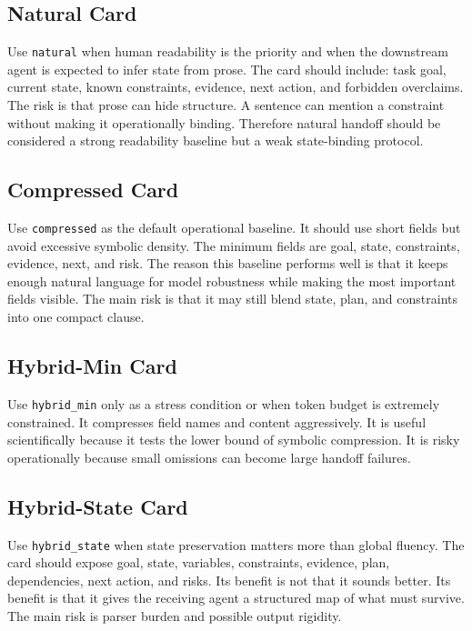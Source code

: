 \documentclass[11pt]{article}
\begin{document}
\subsection{Natural Card}
Use \texttt{natural} when human readability is the priority and when the downstream agent is expected to infer state from prose. The card should include: task goal, current state, known constraints, evidence, next action, and forbidden overclaims. The risk is that prose can hide structure. A sentence can mention a constraint without making it operationally binding. Therefore natural handoff should be considered a strong readability baseline but a weak state-binding protocol.

\subsection{Compressed Card}
Use \texttt{compressed} as the default operational baseline. It should use short fields but avoid excessive symbolic density. The minimum fields are goal, state, constraints, evidence, next, and risk. The reason this baseline performs well is that it keeps enough natural language for model robustness while making the most important fields visible. The main risk is that it may still blend state, plan, and constraints into one compact clause.

\subsection{Hybrid-Min Card}
Use \texttt{hybrid\_min} only as a stress condition or when token budget is extremely constrained. It compresses field names and content aggressively. It is useful scientifically because it tests the lower bound of symbolic compression. It is risky operationally because small omissions can become large handoff failures.

\subsection{Hybrid-State Card}
Use \texttt{hybrid\_state} when state preservation matters more than global fluency. The card should expose goal, state, variables, constraints, evidence, plan, dependencies, next action, and risks. Its benefit is not that it sounds better. Its benefit is that it gives the receiving agent a structured map of what must survive. The main risk is parser burden and possible output rigidity.
\end{document}
